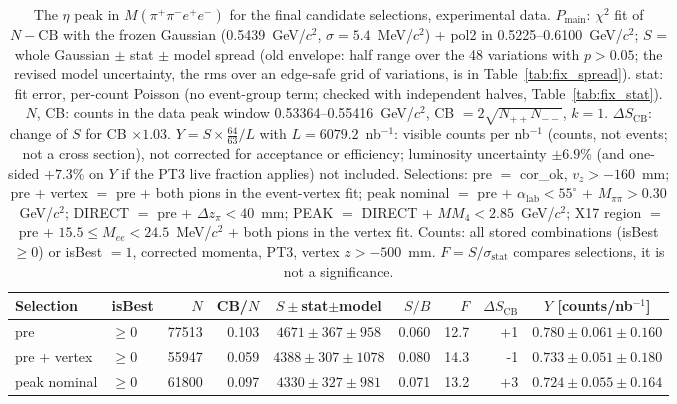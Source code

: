 \begin{table}[H]
\centering\footnotesize
\setlength{\tabcolsep}{3pt}
\caption{The $\eta$ peak in $M(\pi^+\pi^-e^+e^-)$ for the final candidate selections, experimental data. $P_\mathrm{main}$: $\chi^2$ fit of $N-\mathrm{CB}$ with the frozen Gaussian (0.5439~GeV/$c^2$, $\sigma=5.4$~MeV/$c^2$) + pol2 in 0.5225--0.6100~GeV/$c^2$; $S$ = whole Gaussian $\pm$ stat $\pm$ model spread (old envelope: half range over the 48 variations with $p>0.05$; the revised model uncertainty, the rms over an edge-safe grid of variations, is in Table~\ref{tab:fix_spread}). stat: fit error, per-count Poisson (no event-group term; checked with independent halves, Table~\ref{tab:fix_stat}). $N$, CB: counts in the data peak window 0.53364--0.55416~GeV/$c^2$, CB $=2\sqrt{N_{++}N_{--}}$, $k=1$. $\Delta S_\mathrm{CB}$: change of $S$ for CB $\times 1.03$. $Y=S\times\frac{64}{63}/L$ with $L=6079.2$~nb$^{-1}$: visible counts per nb$^{-1}$ (counts, not events; not a cross section), not corrected for acceptance or efficiency; luminosity uncertainty $\pm6.9$\% (and one-sided $+7.3$\% on $Y$ if the PT3 live fraction applies) not included. Selections: pre $=$ cor\_ok, $v_z>-160$~mm; pre + vertex $=$ pre + both pions in the event-vertex fit; peak nominal $=$ pre + $\alpha_\mathrm{lab}<55^\circ$ + $M_{\pi\pi}>0.30$~GeV/$c^2$; DIRECT $=$ pre + $\Delta z_\pi<40$~mm; PEAK $=$ DIRECT + $MM_4<2.85$~GeV/$c^2$; X17 region $=$ pre + $15.5\leq M_{ee}<24.5$~MeV/$c^2$ + both pions in the vertex fit. Counts: all stored combinations (isBest $\geq0$) or isBest $=1$, corrected momenta, PT3, vertex $z>-500$~mm. $F=S/\sigma_\mathrm{stat}$ compares selections, it is not a significance.}
\label{tab:res_peak}
\begin{tabular}{llrrcrrrc}
\toprule
Selection & isBest & $N$ & CB/$N$ & $S\pm$stat$\pm$model & $S/B$ & $F$ & $\Delta S_\mathrm{CB}$ & $Y$ [counts/nb$^{-1}$] \\
\midrule
pre & $\geq0$ & 77513 & 0.103 & $4671\pm367\pm958$ & 0.060 & 12.7 & +1 & $0.780\pm0.061\pm0.160$ \\
pre + vertex & $\geq0$ & 55947 & 0.059 & $4388\pm307\pm1078$ & 0.080 & 14.3 & -1 & $0.733\pm0.051\pm0.180$ \\
peak nominal & $\geq0$ & 61800 & 0.097 & $4330\pm327\pm981$ & 0.071 & 13.2 & +3 & $0.724\pm0.055\pm0.164$ \\

\end{tabular}
\end{table}
